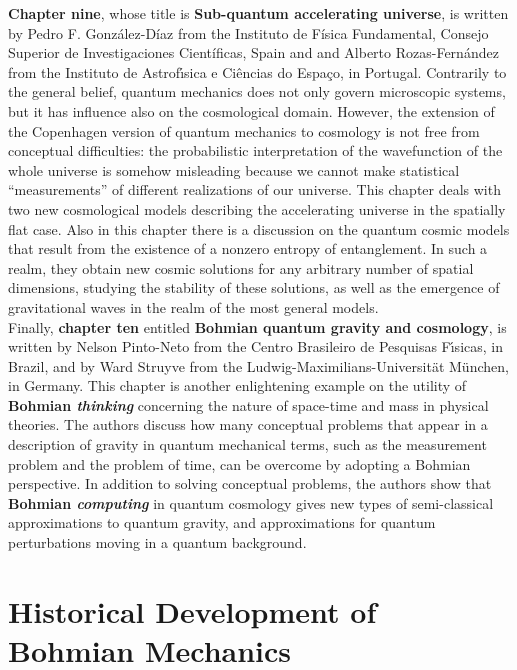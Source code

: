 \documentclass[nofootinbib, secnumarabic, amsmath, nobibnotes,10pt,aps,pra]{revtex4-1}
\begin{document}
\textbf{Chapter nine}, whose title is \textbf{Sub-quantum accelerating universe}, is written by Pedro F. Gonz\'alez-D\'{i}az from the Instituto de F\'isica Fundamental, Consejo Superior de Investigaciones Cient\'ificas, Spain and and Alberto Rozas-Fern\'andez from the Instituto de Astrof\'{\i}sica e Ci\^{e}ncias do Espa\c{c}o, in Portugal. Contrarily to the general belief, quantum mechanics does not only govern microscopic systems, but it has influence also on the cosmological domain. However, the extension of the Copenhagen version of quantum mechanics to cosmology is not free from conceptual difficulties: the probabilistic interpretation of the wavefunction of the whole universe is somehow misleading because we cannot make statistical ``measurements'' of different realizations of our universe. This chapter deals with two new cosmological models describing the accelerating universe in the spatially flat case.  Also in this chapter there is a discussion on the quantum cosmic models that result from the existence of a nonzero entropy of entanglement. In such a realm, they obtain new cosmic solutions for any arbitrary number of spatial dimensions, studying the stability of these solutions, as well as the emergence of gravitational waves in the realm of the most general models. \\

Finally, \textbf{chapter ten} entitled \textbf{Bohmian quantum gravity and cosmology}, is written by Nelson Pinto-Neto from the Centro Brasileiro de Pesquisas F\'{\i}sicas, in Brazil, and by Ward Struyve from the Ludwig-Maximilians-Universit\"at M\"unchen, in Germany. This chapter is another enlightening example on the utility of \textbf{Bohmian \emph{thinking}} concerning the nature of space-time and mass in physical theories. The authors discuss how many conceptual problems that appear in a description of gravity in quantum mechanical terms, such as the measurement problem and the problem of time, can be overcome by adopting a Bohmian perspective.  In addition to solving conceptual problems, the authors show that \textbf{Bohmian \emph{computing}} in quantum cosmology gives new types of semi-classical approximations to quantum gravity, and approximations for quantum perturbations moving in a quantum background. \\


\section{Historical Development of Bohmian Mechanics}\label{om.sec_intro}
\end{document}
